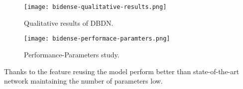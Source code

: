 \begin{figure}
    \centering
    \texttt{[image: bidense-qualitative-results.png]}
    \caption{Qualitative results of DBDN.}
\end{figure}
\begin{figure}
    \centering
    \texttt{[image: bidense-performace-paramters.png]}
    \caption{Performance-Parameters study.}
\end{figure}

Thanks to the feature reusing the model perform better than state-of-the-art network maintaining the number of parameters low.